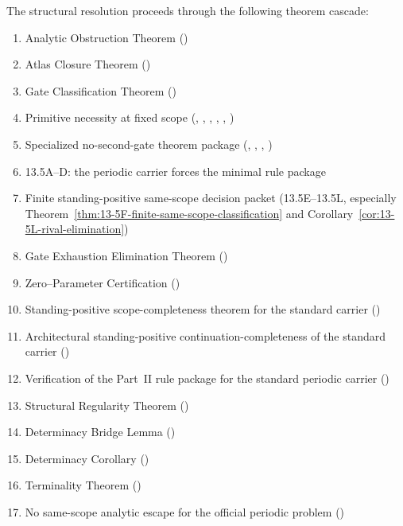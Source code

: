 \begin{tcolorbox}[title=Navier--Stokes admissibility cascade]
The structural resolution proceeds through the following theorem cascade:

\begin{enumerate}[leftmargin=2.2em]
\item Analytic Obstruction Theorem ()
\item Atlas Closure Theorem ()
\item Gate Classification Theorem ()
\item Primitive necessity at fixed scope (, , , , , )
\item Specialized no-second-gate theorem package (, , , )
\item 13.5A--D: the periodic carrier forces the minimal rule package
\item Finite standing-positive same-scope decision packet (13.5E--13.5L, especially Theorem~\ref{thm:13-5F-finite-same-scope-classification} and Corollary~\ref{cor:13-5L-rival-elimination})
\item Gate Exhaustion Elimination Theorem ()
\item Zero--Parameter Certification ()
\item Standing-positive scope-completeness theorem for the standard carrier ()
\item Architectural standing-positive continuation-completeness of the standard carrier ()
\item Verification of the Part~II rule package for the standard periodic carrier ()
\item Structural Regularity Theorem ()
\item Determinacy Bridge Lemma ()
\item Determinacy Corollary ()
\item Terminality Theorem ()
\item No same-scope analytic escape for the official periodic problem ()
\end{enumerate}


\end{tcolorbox}
